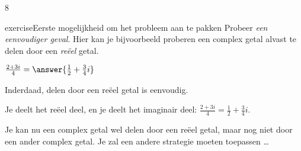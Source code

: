 8\documentclass{ximera}
\begin{document}
    {
    

    \begin{expandable}{exercise}{Eerste mogelijkheid om het probleem aan te pakken}
        Probeer \textit{een eenvoudiger geval}. Hier kan je bijvoorbeeld proberen een complex getal alvast te delen door een \textit{reëel} getal.
        
        \begin{hint}
            $\frac{2+3i}{4} = \answer{\frac{1}{2}+\frac{3}{4}i}$
            \begin{feedback}[correct]
                Inderdaad, delen door een reëel getal is eenvoudig.
            \end{feedback}
        \end{hint}
        \begin{oplossing}
            Je deelt het reëel deel, en je deelt het imaginair deel:
            $\frac{2+3i}{4} = \frac{1}{2}+\frac{3}{4}i$.

            Je kan nu een complex getal wel delen door een reëel getal, maar nog niet door een ander complex getal.
            Je zal een andere strategie moeten toepassen \ldots
        \end{oplossing}
                
    \end{expandable}

}
\end{document}
